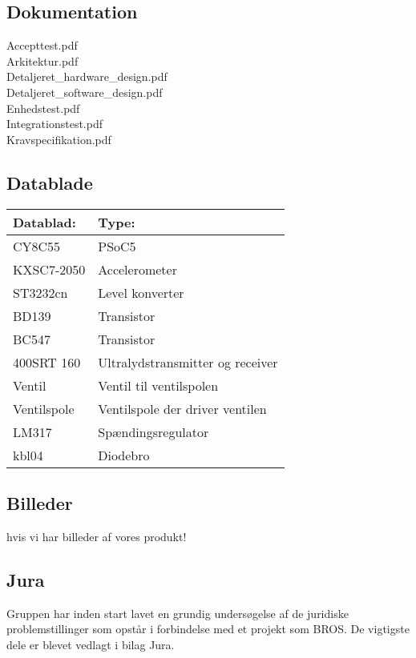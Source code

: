 \subsection{Dokumentation}
Accepttest.pdf\\
Arkitektur.pdf\\
Detaljeret\_hardware\_design.pdf\\
Detaljeret\_software\_design.pdf\\
Enhedstest.pdf\\
Integrationstest.pdf\\
Kravspecifikation.pdf\\

\subsection{Datablade}
\begin{table}[H]
\begin{tabular}{ll}
\textbf{Datablad:}& \textbf{Type:} \\\hline
CY8C55\phantom{mmmmmm} & PSoC5 \\
KXSC7-2050& Accelerometer\\
ST3232cn & Level konverter \\
BD139 & Transistor \\
BC547 & Transistor \\
400SRT 160 & Ultralydstransmitter og receiver \\
Ventil & Ventil til ventilspolen \\
Ventilspole & Ventilspole der driver ventilen \\
LM317 & Spændingsregulator \\
kbl04 & Diodebro \\

\end{tabular}
\end{table}


\subsection{Billeder}
hvis vi har billeder af vores produkt!\\

\subsection{Jura}
Gruppen har inden start lavet en grundig undersøgelse af de juridiske problemstillinger som opstår i forbindelse med et projekt som BROS. De vigtigste dele er blevet vedlagt i bilag Jura.